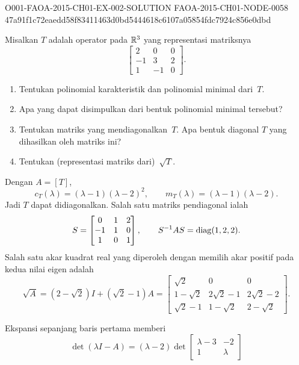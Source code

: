 \begin{o001solution}
  {O001-FAOA-2015-CH01-EX-002-SOLUTION}
  {FAOA-2015-CH01-NODE-0058}
  {47a91f1c72eaedd58f83411463d0bd5444618c6107a05854fdc7924c856e0dbd}
\begin{o001statement}
Misalkan $T$ adalah operator pada $\mathbb{R}^3$ yang representasi matriksnya
    \[
      \begin{bmatrix}
               2  &  0  &  0 \\
              -1  &  3  &  2 \\
               1  & -1  &  0
      \end{bmatrix}.
    \]
  \begin{enumerate}
    \item Tentukan polinomial karakteristik dan polinomial minimal dari~$T$.
    \item Apa yang dapat disimpulkan dari bentuk polinomial minimal tersebut?
    \item Tentukan matriks yang mendiagonalkan~$T$. Apa bentuk diagonal $T$ yang dihasilkan oleh matriks ini?
    \item Tentukan (representasi matriks dari)~$\sqrt T$.
  \end{enumerate}
\end{o001statement}
\begin{o001answer}
Dengan $A=[T]$,
\[
 c_T(\lambda)=(\lambda-1)(\lambda-2)^2,\qquad
 m_T(\lambda)=(\lambda-1)(\lambda-2).
\]
Jadi $T$ dapat didiagonalkan. Salah satu matriks pendiagonal ialah
\[
 S=\begin{bmatrix}0&1&2\\-1&1&0\\1&0&1\end{bmatrix},
 \qquad S^{-1}AS=\operatorname{diag}(1,2,2).
\]
Salah satu akar kuadrat real yang diperoleh dengan memilih akar positif pada
kedua nilai eigen adalah
\[
 \sqrt A=(2-\sqrt2)I+(\sqrt2-1)A
 =\begin{bmatrix}
 \sqrt2&0&0\\
 1-\sqrt2&2\sqrt2-1&2\sqrt2-2\\
 \sqrt2-1&1-\sqrt2&2-\sqrt2
 \end{bmatrix}.
\]
\end{o001answer}
\begin{o001proof}
Ekspansi sepanjang baris pertama memberi
\[
\det(\lambda I-A)
 =(\lambda-2)
   \det\begin{bmatrix}\lambda-3&-2\\1&\lambda\end{bmatrix}
\]
\end{o001proof}
\end{o001solution}
